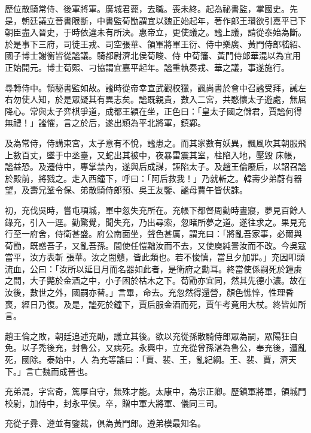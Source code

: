 \begin{pinyinscope}
 歷位散騎常侍、後軍將軍。廣城君薨，去職。喪未終。起為祕書監，掌國史。先是，朝廷議立晉書限斷，中書監荀勖謂宜以魏正始起年，著作郎王瓚欲引嘉平已下朝臣盡入晉史，于時依違未有所決。惠帝立，更使議之。謐上議，請從泰始為斷。於是事下三府，司徒王戎、司空張華、領軍將軍王衍、侍中樂廣、黃門侍郎嵇紹、國子博士謝衡皆從謐議。騎都尉濟北侯荀畯、侍
 中荀籓、黃門侍郎華混以為宜用正始開元。博士荀熙、刁協謂宜嘉平起年。謐重執奏戎、華之議，事遂施行。



 尋轉侍中。領秘書監如故。謐時從帝幸宣武觀校獵，諷尚書於會中召謐受拜，誡左右勿使人知，於是眾疑其有異志矣。謐既親貴，數入二宮，共愍懷太子遊處，無屈降心。常與太子弈棋爭道，成都王穎在坐，正色曰：「皇太子國之儲君，賈謐何得無禮！」謐懼，言之於后，遂出穎為平北將軍，鎮鄴。



 及為常侍，侍講東宮，太子意有不悅，謐患之。而其家數有妖異，飄風吹其朝服飛上數百丈，墜于中丞臺，又蛇出其被中，夜暴雷震其室，柱陷入地，壓毀
 床帳，謐益恐。及遷侍中，專掌禁內，遂與后成謀，誣陷太子。及趙王倫廢后，以詔召謐於殿前，將戮之。走入西鐘下，呼曰：「阿后救我！」乃就斬之。韓壽少弟蔚有器望，及壽兄鞏令保、弟散騎侍郎預、吳王友鑒、謐母賈午皆伏誅。



 初，充伐吳時，嘗屯項城，軍中忽失充所在。充帳下都督周勤時晝寢，夢見百餘人錄充，引入一逕。勤驚覺，聞失充，乃出尋索，忽睹所夢之道。遂往求之。果見充行至一府舍，侍衛甚盛。府公南面坐，聲色甚厲，謂充曰：「將亂吾家事，必爾與荀勖，既惑吾子，又亂吾孫。間使任愷黜汝而不去，又使庾純詈汝而不改。今吳寇當平，汝方表斬
 張華。汝之闇戇，皆此類也。若不悛慎，當旦夕加罪。」充因叩頭流血，公曰：「汝所以延日月而名器如此者，是衛府之勳耳。終當使係嗣死於鐘虡之間，大子斃於金酒之中，小子困於枯木之下。荀勖亦宜同，然其先德小濃。故在汝後，數世之外，國嗣亦替。」言畢，命去。充忽然得還營，顏色憔悴，性理昏喪，經日乃復。及是，謐死於鐘下，賈后服金酒而死，賈午考竟用大杖。終皆如所言。



 趙王倫之敗，朝廷追述充勛，議立其後。欲以充從孫散騎侍郎眾為嗣，眾陽狂自免。以子禿後充，封魯公，又病死。永興中，立充從曾孫湛為魯公，奉充後，遭亂死，國除。泰始中，人
 為充等謠曰：「賈、裴、王，亂紀綱。王、裴、賈，濟天下。」言亡魏而成晉也。



 充弟混，字宮奇，篤厚自守，無殊才能。太康中，為宗正卿。歷鎮軍將軍，領城門校尉，加侍中，封永平侯。卒，贈中軍大將軍、儀同三司。



 充從子彞、遵並有鑒裁，俱為黃門郎。遵弟模最知名。




\end{pinyinscope}
